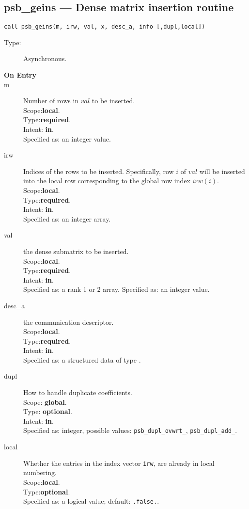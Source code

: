 %
%
\clearpage\subsection{psb\_geins --- Dense matrix insertion routine}

\begin{verbatim}
call psb_geins(m, irw, val, x, desc_a, info [,dupl,local])
\end{verbatim}

\begin{description}
\item[Type:] Asynchronous.
\item[\bf On Entry]
\item[m] Number of rows in $val$  to be inserted.\\
Scope:{\bf local}.\\
Type:{\bf required}.\\
Intent: {\bf in}.\\
Specified as: an integer value.
\item[irw] Indices of the rows to be inserted. Specifically, row $i$
  of $val$ will be inserted into the local row corresponding to the
  global row index $irw(i)$.
Scope:{\bf local}.\\
Type:{\bf required}.\\
Intent: {\bf in}.\\
Specified as: an integer array.
\item[val] the dense submatrix to be inserted.\\
Scope:{\bf local}.\\
Type:{\bf required}.\\
Intent: {\bf in}.\\
Specified as: a rank 1 or 2  array.
Specified as: an integer value.
\item[desc\_a] the communication descriptor.\\
Scope:{\bf local}.\\
Type:{\bf required}.\\
Intent: {\bf in}.\\
Specified as: a structured data of type \descdata.
\item[dupl] How to handle duplicate coefficients.\\
Scope: {\bf global}.\\
Type: {\bf optional}.\\
Intent: {\bf in}.\\
Specified as: integer, possible values: \verb|psb_dupl_ovwrt_|,
\verb|psb_dupl_add_|.
\item[local] Whether the entries in the index vector \verb|irw|,
   are already in local  numbering. \\
 Scope:{\bf local}.\\
 Type:{\bf optional}.\\
 Specified as: a logical value; default: \verb|.false.|.

\end{description}

